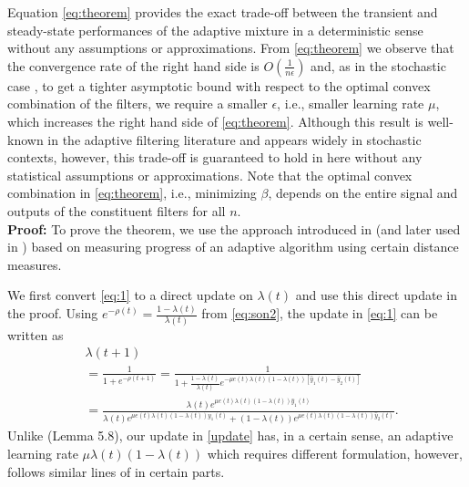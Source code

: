 \documentclass[journal]{IEEEtran}
\newcommand{\nn}{\nonumber}
\begin{document}
Equation \eqref{eq:theorem} provides the exact trade-off between the
transient and steady-state performances of the adaptive mixture in a
deterministic sense without any assumptions or approximations.  From
 \eqref{eq:theorem} we observe that the convergence rate of the right hand
side is $O\left( \frac{1}{n\epsilon} \right)$ and, as in the
stochastic case \cite{kozat}, to get a tighter asymptotic bound with
respect to the optimal convex combination of the filters, we require a
smaller $\epsilon$, i.e., smaller learning rate $\mu$, which increases
the right hand side of \eqref{eq:theorem}.  Although this result is
well-known in the adaptive filtering literature and appears widely in
stochastic contexts, however, this trade-off is guaranteed to hold in
here without any statistical assumptions or approximations.  Note that
the optimal convex combination in \eqref{eq:theorem}, i.e., minimizing $\beta$,
depends on the entire signal and outputs of the
constituent filters for all $n$.\\

\noindent
{\bf Proof:} To prove the theorem, we use the approach introduced in
\cite{cesab} (and later used in \cite{KiWa02}) based on
measuring progress of an adaptive algorithm using certain distance
measures.

We first convert \eqref{eq:1} to a direct update on $\lambda(t)$ and
use this direct update in the proof. Using $e^{-\rho(t)} = \frac{1-\lambda(t)}{\lambda(t)}$ from \eqref{eq:son2}, the update in \eqref{eq:1} can be written as
\small
\begin{align}
&\lambda(t+1)\nn\\ &= \frac{1}{1+e^{-\rho(t+1)}}
= \frac{1}{1+ \frac{1-\lambda(t)}{\lambda(t)} e^{-\mu e(t)\lambda(t)(1-\lambda(t)) [\hat{y}_1(t)-\hat{y}_2(t)]}} \nonumber \\
             & = \frac{\lambda(t)e^{\mu e(t) \lambda(t) (1-\lambda(t)) \hat{y}_1(t)}}{\lambda(t)e^{\mu e(t) \lambda(t) (1-\lambda(t)) \hat{y}_1(t)} + (1-\lambda(t))e^{\mu e(t) \lambda(t) (1-\lambda(t)) \hat{y}_2(t)}}.
\label{update}
\end{align}\normalsize
Unlike \cite{KiWa02} (Lemma 5.8), our update in \eqref{update} has,
in a certain sense, an adaptive learning rate $\mu \lambda(t)
(1-\lambda(t))$ which requires different formulation, however, follows
similar lines of \cite{KiWa02} in certain parts.
\end{document}
